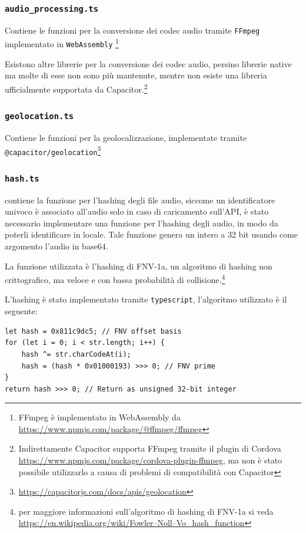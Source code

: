 \documentclass{article}
\begin{document}


\subsubsection{\texttt{audio\_processing.ts}}
Contiene le funzioni per la conversione dei codec audio tramite \texttt{FFmpeg} implementato in \texttt{WebAssembly} \footnote{FFmpeg è implementato in WebAssembly da \url{https://www.npmjs.com/package/@ffmpeg/ffmpeg}}

Esistono altre librerie per la conversione dei codec audio, persino librerie native ma molte di esse non sono più mantenute, mentre non esiste una libreria ufficialmente supportata da Capacitor.\footnote{Indirettamente Capacitor supporta FFmpeg tramite il plugin di Cordova \url{https://www.npmjs.com/package/cordova-plugin-ffmpeg}, ma non è stato possibile utilizzarlo a causa di problemi di compatibilità con Capacitor}

\subsubsection{\texttt{geolocation.ts}}
Contiene le funzioni per la geolocalizzazione, implementate tramite \texttt{@capacitor/geolocation}\footnote{\url{https://capacitorjs.com/docs/apis/geolocation}}

\subsubsection{\texttt{hash.ts}}
 contiene la funzione per l'hashing degli file audio, siccome un identificatore univoco è associato all'audio solo in caso di caricamento sull'API, è stato necessario implementare una funzione per l'hashing degli audio, in modo da poterli identificare in locale. Tale funzione genera un intero a 32 bit usando come argomento l'audio in base64.

La funzione utilizzata è l'hashing di FNV-1a, un algoritmo di hashing non crittografico, ma veloce e con bassa probabilità di collisione.\footnote{per maggiore informazioni sull'algoritmo di hashing di FNV-1a si veda \url{https://en.wikipedia.org/wiki/Fowler–Noll–Vo_hash_function}}

 L'hashing è stato implementato tramite \texttt{typescript}, l'algoritmo utilizzato è il seguente:
\begin{verbatim}
let hash = 0x811c9dc5; // FNV offset basis
for (let i = 0; i < str.length; i++) {
    hash ^= str.charCodeAt(i);
    hash = (hash * 0x01000193) >>> 0; // FNV prime
}
return hash >>> 0; // Return as unsigned 32-bit integer
\end{verbatim}
\end{document}
